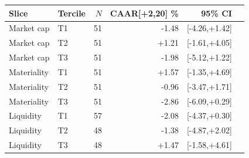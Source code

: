\begin{tabular}{llrrrr}
\toprule
Slice & Tercile & $N$ & CAAR[+2,20] \% & 95\% CI \\
\midrule
Market cap & T1 & 51 & -1.48 & [-4.26,+1.42] \\
Market cap & T2 & 51 & +1.21 & [-1.61,+4.05] \\
Market cap & T3 & 51 & -1.98 & [-5.12,+1.22] \\
Materiality & T1 & 51 & +1.57 & [-1.35,+4.69] \\
Materiality & T2 & 51 & -0.96 & [-3.47,+1.71] \\
Materiality & T3 & 51 & -2.86 & [-6.09,+0.29] \\
Liquidity & T1 & 57 & -2.08 & [-4.37,+0.30] \\
Liquidity & T2 & 48 & -1.38 & [-4.87,+2.02] \\
Liquidity & T3 & 48 & +1.47 & [-1.58,+4.61] \\
\bottomrule
\end{tabular}